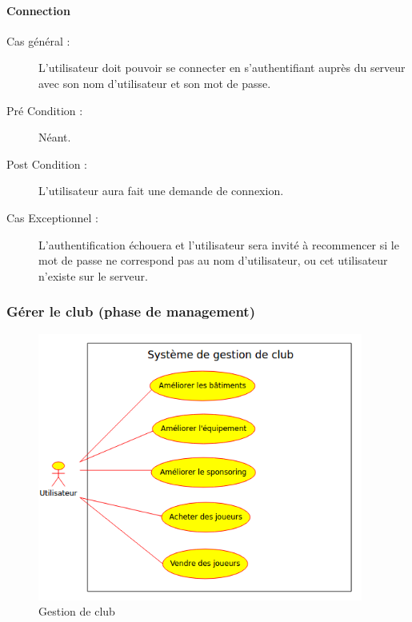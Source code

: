 \documentclass[a4paper]{article}
\begin{document}
\paragraph{Connection}
\begin{description}
\item[Cas général :] L'\gls{utilisateur} doit pouvoir se connecter en s'authentifiant auprès du \gls{serveur} avec son nom d'\gls{utilisateur} et son mot de passe.
\item[Pré Condition  :] Néant.
\item[Post Condition :] L'\gls{utilisateur} aura fait une demande de connexion.
\item[Cas Exceptionnel :] L'authentification échouera et l'\gls{utilisateur} sera invité à recommencer si le mot de passe ne correspond pas au nom d'\gls{utilisateur}, ou cet \gls{utilisateur} n'existe sur le \gls{serveur}.
\end{description}

\subsubsection{Gérer le \gls{club} (phase de management)}
\begin{figure}[h]
    \caption{\label{1} Gestion de \gls{club}}
   \begin{center}
   \includegraphics[height=250pt]{uml/mngClub.png}
   \end{center}
\end{figure}
\end{document}

